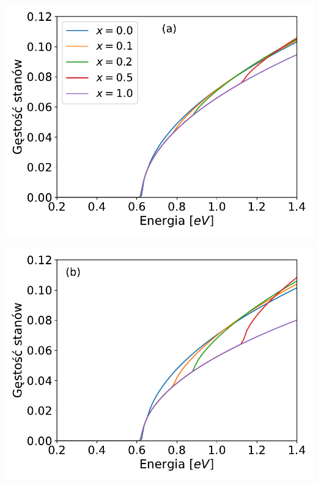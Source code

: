 \documentclass[12pt,openany,a4paper]{book}
\begin{document}
\begin{minipage}[t]{0.42\textwidth}
	\hspace{-2.1cm}
	\includegraphics[width = 1\linewidth]{Figures/carriers/dos_L_100.pdf}
\end{minipage}
\begin{minipage}[t]{0.42\textwidth}
	\hspace{-2.5cm}
	\includegraphics[width = 1\linewidth]{Figures/carriers/dos_L_300.pdf}
\end{minipage}
\end{document}
